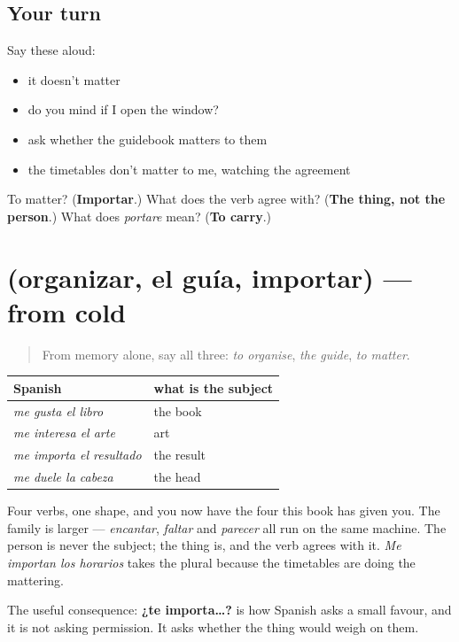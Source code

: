 \subsection*{Your turn}
Say these aloud:

\begin{itemize}
\raggedright
  \item it doesn't matter
  \item do you mind if I open the window?
  \item ask whether the guidebook matters to them
  \item the timetables don't matter to me, watching the agreement
\end{itemize}

\begin{tcolorbox}[breakable,colback=teal!4,colframe=teal!35!black,title={Before you move on}]
To matter? (\textbf{Importar}.) What does the verb agree with? (\textbf{The thing, not the person}.) What does \emph{portare} mean? (\textbf{To carry}.)
\end{tcolorbox}
\section[(organizar, el guía, importar)]{(organizar, el guía, importar) — from cold}

\label{lesson:ES-R463-repaso-guia}



\begin{quote}
From memory alone, say all three: \emph{to organise}, \emph{the guide}, \emph{to matter}.
\end{quote}

\begin{grammarlens}[title={Grammar Lens: the verbs where the thing is the subject}]
\noindent
\begin{tabularx}{\linewidth}{@{}>{\raggedright\arraybackslash}X>{\raggedright\arraybackslash}X@{}}
\toprule
\textbf{Spanish} & \textbf{what is the subject} \\
\midrule
\emph{me gusta el libro} & the book \\
\emph{me interesa el arte} & art \\
\emph{me importa el resultado} & the result \\
\emph{me duele la cabeza} & the head \\
\bottomrule
\end{tabularx}

Four verbs, one shape, and you now have the four this book has given you. The family is larger — \emph{encantar}, \emph{faltar} and \emph{parecer} all run on the same machine. The person is never the subject; the thing is, and the verb agrees with it. \emph{Me importan los horarios} takes the plural because the timetables are doing the mattering.

The useful consequence: \textbf{¿te importa…?} is how Spanish asks a small favour, and it is not asking permission. It asks whether the thing would weigh on them.
\end{grammarlens}

